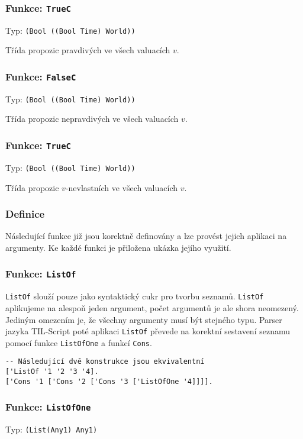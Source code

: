 \subsubsection*{Funkce: \lstinline|TrueC|}
Typ: \lstinline|(Bool ((Bool Time) World))|

Třída propozic pravdivých ve všech valuacích $v$.

\subsubsection*{Funkce: \lstinline|FalseC|}
Typ: \lstinline|(Bool ((Bool Time) World))|

Třída propozic nepravdivých ve všech valuacích $v$.

\subsubsection*{Funkce: \lstinline|TrueC|}
Typ: \lstinline|(Bool ((Bool Time) World))|

Třída propozic $v$-nevlastních ve všech valuacích $v$.

\subsubsection{Definice}

Následující funkce již jsou korektně definovány a lze provést jejich aplikaci na argumenty. Ke každé
funkci je přiložena ukázka jejího využití.

\subsubsection*{Funkce: \lstinline|ListOf|}

\lstinline{ListOf} slouží pouze jako syntaktický cukr pro tvorbu seznamů. \lstinline{ListOf}
aplikujeme na alespoň jeden argument, počet argumentů je ale shora neomezený. Jediným omezením je,
že všechny argumenty musí být stejného typu. Parser jazyka TIL-Script poté aplikaci
\lstinline{ListOf} převede na korektní sestavení seznamu pomocí funkce \lstinline{ListOfOne} a
funkcí \lstinline{Cons}.


\begin{lstlisting}[caption={Ukázka využití ListOf}]
-- Následující dvě konstrukce jsou ekvivalentní
['ListOf '1 '2 '3 '4].
['Cons '1 ['Cons '2 ['Cons '3 ['ListOfOne '4]]]].
\end{lstlisting}

\subsubsection*{Funkce: \lstinline|ListOfOne|}
Typ: \lstinline{(List(Any1) Any1)}

